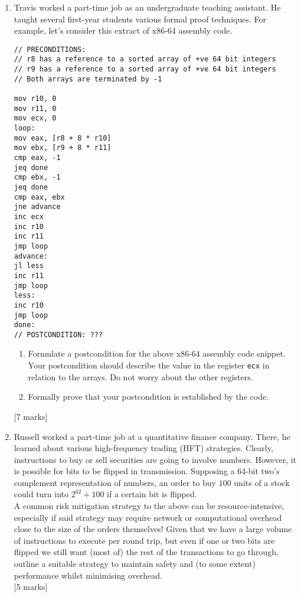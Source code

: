 \documentclass[12pt, a4paper]{article}
\begin{document}
\begin{enumerate}
\item Travis worked a part-time job as an undergraduate teaching assistant. He taught several first-year students various formal proof techniques. For example, let's consider this extract of x86-64 assembly code.

\begin{lstlisting}
// PRECONDITIONS:
// r8 has a reference to a sorted array of +ve 64 bit integers
// r9 has a reference to a sorted array of +ve 64 bit integers
// Both arrays are terminated by -1

mov r10, 0
mov r11, 0
mov ecx, 0
loop:
mov eax, [r8 + 8 * r10]
mov ebx, [r9 + 8 * r11]
cmp eax, -1
jeq done
cmp ebx, -1
jeq done
cmp eax, ebx
jne advance
inc ecx
inc r10
inc r11
jmp loop
advance:
jl less
inc r11
jmp loop
less:
inc r10
jmp loop
done:
// POSTCONDITION: ???

\end{lstlisting}

\begin{enumerate}
\item Formulate a postcondition for the above x86-64 assembly code snippet. Your postcondition should describe the value in the register \texttt{ecx} in relation to the arrays. Do not worry about the other registers.
\item Formally prove that your postcondition is established by the code.
\end{enumerate}
[7 marks]

\item Russell worked a part-time job at a quantitative finance company. There, he learned about various high-frequency trading (HFT) strategies. Clearly, instructions to buy or sell securities are going to involve numbers. However, it is possible for bits to be flipped in transmission. Supposing a 64-bit two's complement representation of numbers, an order to buy $100$ units of a stock could turn into $2^{62} + 100$ if a certain bit is flipped. \\[12pt]
A common risk mitigation strategy to the above can be resource-intensive, especially if said strategy may require network or computational overhead close to the size of the orders themselves! Given that we have a large volume of instructions to execute per round trip, but even if one or two bits are flipped we still want (most of) the rest of the transactions to go through, outline a suitable strategy to maintain safety and (to some extent) performance whilst minimising overhead. %
\\[12pt]
[5 marks]


\end{enumerate}
\end{document}
